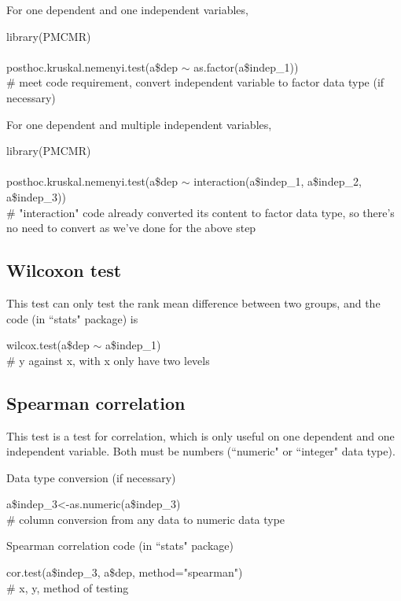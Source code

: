 \documentclass[../note.tex]{subfiles} %
\begin{document}
For one dependent and one independent variables,
\begin{code}
library(PMCMR)\\\\
posthoc.kruskal.nemenyi.test(a\$dep $\sim$ as.factor(a\$indep\_1))\\\# meet code requirement, convert independent variable to factor data type (if necessary)
\end{code}

For one dependent and multiple independent variables,
\begin{code}
library(PMCMR)\\\\
posthoc.kruskal.nemenyi.test(a\$dep $\sim$ interaction(a\$indep\_1, a\$indep\_2, a\$indep\_3))\\\# "interaction" code already converted its content to factor data type, so there's no need to convert as we've done for the above step
\end{code}

\subsection{Wilcoxon test}
This test can only test the rank mean difference between two groups, and the code (in ``stats" package\autocite{Rcore}) is
\begin{code}
wilcox.test(a\$dep $\sim$ a\$indep\_1)\\\# y against x, with x only have two levels
\end{code}

\subsection{Spearman correlation}
This test is a test for correlation, which is only useful on one dependent and one independent variable.  Both must be numbers (``numeric" or ``integer" data type).

Data type conversion (if necessary)
\begin{code}
a\$indep\_3<-as.numeric(a\$indep\_3)\\\# column conversion from any data to numeric data type
\end{code}

Spearman correlation code (in ``stats" package\autocite{Rcore})
\begin{code}
cor.test(a\$indep\_3, a\$dep, method="spearman")\\\# x, y, method of testing
\end{code}
\end{document}
